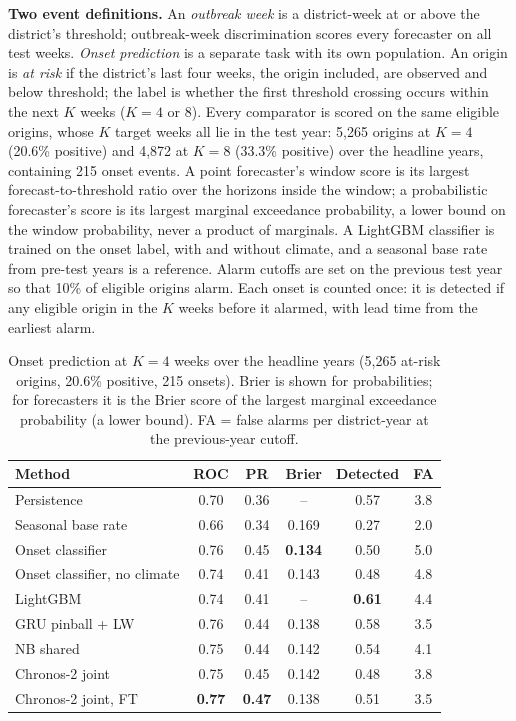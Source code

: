 \textbf{Two event definitions.} An \emph{outbreak week} is a district-week at or above the district's threshold; outbreak-week discrimination scores every forecaster on all test weeks. \emph{Onset prediction} is a separate task with its own population. An origin is \emph{at risk} if the district's last four weeks, the origin included, are observed and below threshold; the label is whether the first threshold crossing occurs within the next $K$ weeks ($K=4$ or 8). Every comparator is scored on the same eligible origins, whose $K$ target weeks all lie in the test year: 5{,}265 origins at $K=4$ (20.6\% positive) and 4{,}872 at $K=8$ (33.3\% positive) over the headline years, containing 215 onset events. A point forecaster's window score is its largest forecast-to-threshold ratio over the horizons inside the window; a probabilistic forecaster's score is its largest marginal exceedance probability, a lower bound on the window probability, never a product of marginals. A LightGBM classifier is trained on the onset label, with and without climate, and a seasonal base rate from pre-test years is a reference. Alarm cutoffs are set on the previous test year so that 10\% of eligible origins alarm. Each onset is counted once: it is detected if any eligible origin in the $K$ weeks before it alarmed, with lead time from the earliest alarm.

\begin{table}[t]
\centering
\caption{Onset prediction at $K=4$ weeks over the headline years (5{,}265 at-risk origins, 20.6\% positive, 215 onsets). Brier is shown for probabilities; for forecasters it is the Brier score of the largest marginal exceedance probability (a lower bound). FA = false alarms per district-year at the previous-year cutoff.}
\label{tab:ews}
\small
\setlength{\tabcolsep}{3pt}
\begin{tabular}{lccccc}
\toprule
\textbf{Method} & \textbf{ROC} & \textbf{PR} & \textbf{Brier} & \textbf{Detected} & \textbf{FA} \\
\midrule
Persistence & 0.70 & 0.36 & -- & 0.57 & 3.8 \\
Seasonal base rate & 0.66 & 0.34 & 0.169 & 0.27 & 2.0 \\
Onset classifier & 0.76 & 0.45 & \textbf{0.134} & 0.50 & 5.0 \\
Onset classifier, no climate & 0.74 & 0.41 & 0.143 & 0.48 & 4.8 \\
LightGBM & 0.74 & 0.41 & -- & \textbf{0.61} & 4.4 \\
GRU pinball + LW & 0.76 & 0.44 & 0.138 & 0.58 & 3.5 \\
NB shared & 0.75 & 0.44 & 0.142 & 0.54 & 4.1 \\
Chronos-2 joint & 0.75 & 0.45 & 0.142 & 0.48 & 3.8 \\
Chronos-2 joint, FT & \textbf{0.77} & \textbf{0.47} & 0.138 & 0.51 & 3.5 \\
\bottomrule
\end{tabular}
\end{table}

